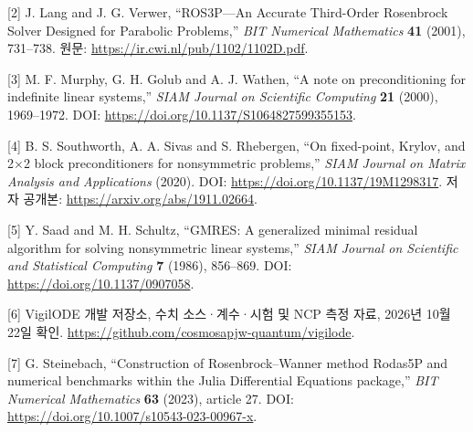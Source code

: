 \documentclass[
  10pt,
  a4paper,
]{article}
\begin{document}
{[}2{]} J. Lang and J. G. Verwer, ``ROS3P---An Accurate Third-Order
Rosenbrock Solver Designed for Parabolic Problems,'' \emph{BIT Numerical
Mathematics} \textbf{41} (2001), 731--738. 원문:
\url{https://ir.cwi.nl/pub/1102/1102D.pdf}.

{[}3{]} M. F. Murphy, G. H. Golub and A. J. Wathen, ``A note on
preconditioning for indefinite linear systems,'' \emph{SIAM Journal on
Scientific Computing} \textbf{21} (2000), 1969--1972. DOI:
\url{https://doi.org/10.1137/S1064827599355153}.

{[}4{]} B. S. Southworth, A. A. Sivas and S. Rhebergen, ``On
fixed-point, Krylov, and 2×2 block preconditioners for nonsymmetric
problems,'' \emph{SIAM Journal on Matrix Analysis and Applications}
(2020). DOI: \url{https://doi.org/10.1137/19M1298317}. 저자 공개본:
\url{https://arxiv.org/abs/1911.02664}.

{[}5{]} Y. Saad and M. H. Schultz, ``GMRES: A generalized minimal
residual algorithm for solving nonsymmetric linear systems,'' \emph{SIAM
Journal on Scientific and Statistical Computing} \textbf{7} (1986),
856--869. DOI: \url{https://doi.org/10.1137/0907058}.

{[}6{]} VigilODE 개발 저장소, 수치 소스·계수·시험 및 NCP 측정 자료,
2026년 10월 22일 확인.
\url{https://github.com/cosmosapjw-quantum/vigilode}.

{[}7{]} G. Steinebach, ``Construction of Rosenbrock--Wanner method
Rodas5P and numerical benchmarks within the Julia Differential Equations
package,'' \emph{BIT Numerical Mathematics} \textbf{63} (2023), article
27. DOI: \url{https://doi.org/10.1007/s10543-023-00967-x}.
\end{document}
